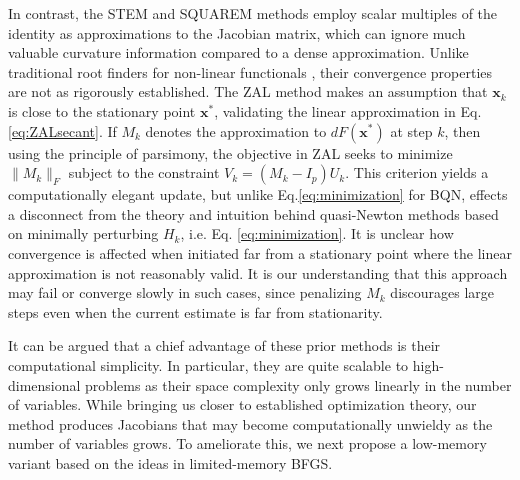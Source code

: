 \documentclass{statsoc}
\newcommand{\bx}{\boldsymbol{x}}
\newcommand{\jx}[1]{{\color{blue}{ #1}}}
\begin{document}
In contrast, the STEM and SQUAREM methods employ scalar multiples of the identity as approximations to the Jacobian matrix, which can ignore much valuable curvature information compared to a dense approximation. %
Unlike traditional root finders for non-linear functionals \citep{broyden1965class, pearson1969variable}, their convergence properties are not as rigorously established. The ZAL method makes an assumption that $\bx_k$ is close to the stationary point $\bx^\ast$, validating the linear approximation in Eq.\eqref{eq:ZALsecant}. If $M_k$ denotes the approximation to $dF(\bx^\ast)$ at step $k$, then using the principle of parsimony, the objective in ZAL seeks to minimize $\|M_k\|_F$  subject to the constraint $V_k = (M_k - I_p)U_k$. This criterion yields a computationally elegant update, but unlike Eq.\eqref{eq:minimization} for BQN, effects a disconnect from the theory and intuition behind quasi-Newton methods based on minimally perturbing $H_k$, i.e. Eq. \eqref{eq:minimization}. It is unclear %
how convergence is affected when initiated far from a stationary point where the linear approximation is not reasonably valid. It is our understanding that this approach may fail or converge slowly in such cases, %
since penalizing $M_k$ discourages large steps even when the current estimate is far from stationarity. %

It can be argued that 
a chief advantage of these prior methods is their computational simplicity. In particular, they are quite scalable to high-dimensional problems as their space complexity only grows linearly in the number of variables.
While bringing us closer to established optimization theory, our method produces Jacobians that may become computationally unwieldy as the number of variables grows. To ameliorate this,  we next propose a low-memory variant  based on the ideas in limited-memory BFGS. 
\end{document}

